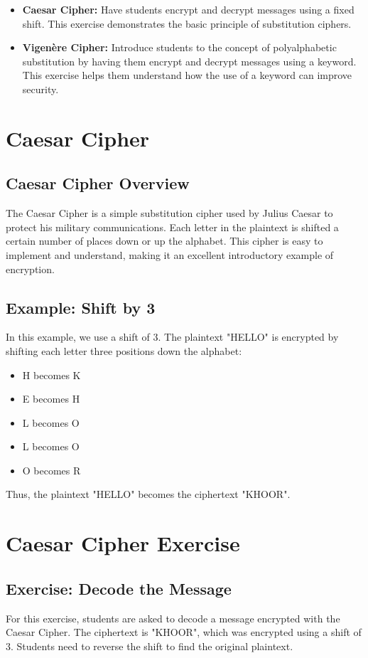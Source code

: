 \begin{itemize}
    \item \textbf{Caesar Cipher:} Have students encrypt and decrypt messages using a fixed shift. This exercise demonstrates the basic principle of substitution ciphers.
    \item \textbf{Vigenère Cipher:} Introduce students to the concept of polyalphabetic substitution by having them encrypt and decrypt messages using a keyword. This exercise helps them understand how the use of a keyword can improve security.
\end{itemize}



\chapter{Caesar Cipher}

\section*{Caesar Cipher Overview}
The Caesar Cipher is a simple substitution cipher used by Julius Caesar to protect his military communications. Each letter in the plaintext is shifted a certain number of places down or up the alphabet. This cipher is easy to implement and understand, making it an excellent introductory example of encryption.

\section*{Example: Shift by 3}
In this example, we use a shift of 3. The plaintext "HELLO" is encrypted by shifting each letter three positions down the alphabet:
\begin{itemize}
    \item H becomes K
    \item E becomes H
    \item L becomes O
    \item L becomes O
    \item O becomes R
\end{itemize}
Thus, the plaintext "HELLO" becomes the ciphertext "KHOOR".

\chapter{Caesar Cipher Exercise}

\section*{Exercise: Decode the Message}
For this exercise, students are asked to decode a message encrypted with the Caesar Cipher. The ciphertext is "KHOOR", which was encrypted using a shift of 3. Students need to reverse the shift to find the original plaintext.

